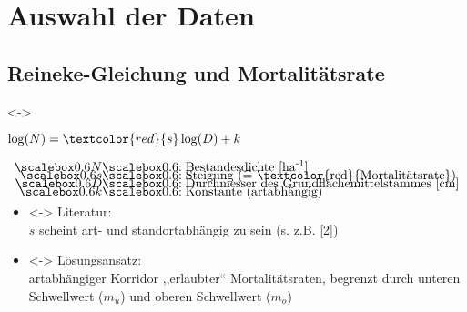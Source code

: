 \section{Auswahl der Daten}
\subsection{Reineke-Gleichung und Mortalitätsrate}
\begin{frame}[c]
  \visible<\theFirstElement->{
    \centerline{
      \(\log(N) = \textcolor{red}{s} \log(D) + k\)
    }
    
    \begin{minipage}{1.0\textwidth}
      \centerline{
      }
    \end{minipage}
    \begin{align*}
      \myscalebox{N} & \myscalebox{: \text{Bestandesdichte [ha\textsuperscript{-1}]}} \\[-3mm]
      \myscalebox{s} & \myscalebox{: \text{Steigung (}\widehat{=}\text{ \textcolor{red}{Mortalitätsrate})}} \\[-3mm]
      \myscalebox{D} & \myscalebox{: \text{Durchmesser des Grundflächemittelstammes [cm]}} \\[-3mm]
      \myscalebox{k} & \myscalebox{: \text{Konstante (artabhängig)}} \\[-3mm]
    \end{align*}}
  
  \begin{itemize}
  \item<\theSecondElement-> Literatur: \\
    \(s\) scheint art- und standortabhängig zu sein (s. z.B. [2])
  \item<\theSecondElement-> Lösungsansatz: \\
    artabhängiger Korridor ,,erlaubter`` Mortalitätsraten, begrenzt durch unteren Schwellwert (\(m_u\)) und oberen Schwellwert (\(m_o\))
  \end{itemize}
\end{frame}

